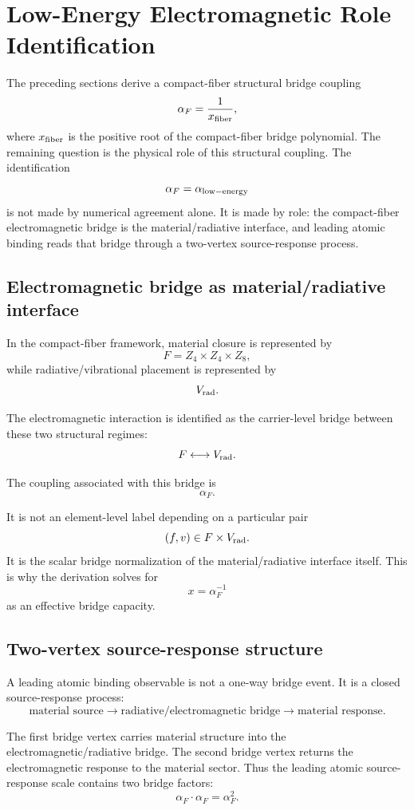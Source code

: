 \section{Low-Energy Electromagnetic Role Identification}

The preceding sections derive a compact-fiber structural bridge coupling
\[
\alpha_F=\frac1{x_{\rm fiber}},
\]
where \(x_{\rm fiber}\) is the positive root of the compact-fiber bridge polynomial. The remaining question is the physical role of this structural coupling. The identification
\[
\alpha_F=\alpha_{\rm low-energy}
\]
is not made by numerical agreement alone. It is made by role: the compact-fiber electromagnetic bridge is the material/radiative interface, and leading atomic binding reads that bridge through a two-vertex source-response process.

\subsection{Electromagnetic bridge as material/radiative interface}

In the compact-fiber framework, material closure is represented by
\[
F=Z_4\times Z_4\times Z_8,
\]
while radiative/vibrational placement is represented by
\[
V_{\rm rad}.
\]

The electromagnetic interaction is identified as the carrier-level bridge between these two structural regimes:
\[
F
\longleftrightarrow
V_{\rm rad}.
\]

The coupling associated with this bridge is
\[
\alpha_F.
\]

It is not an element-level label depending on a particular pair
\[
(f,v)\in F\times V_{\rm rad}.
\]
It is the scalar bridge normalization of the material/radiative interface itself. This is why the derivation solves for
\[
x=\alpha_F^{-1}
\]
as an effective bridge capacity.

\subsection{Two-vertex source-response structure}

A leading atomic binding observable is not a one-way bridge event. It is a closed source-response process:
\[
\text{material source}
\rightarrow
\text{radiative/electromagnetic bridge}
\rightarrow
\text{material response}.
\]

The first bridge vertex carries material structure into the electromagnetic/radiative bridge. The second bridge vertex returns the electromagnetic response to the material sector. Thus the leading atomic source-response scale contains two bridge factors:
\[
\alpha_F\cdot\alpha_F=\alpha_F^2.
\]

